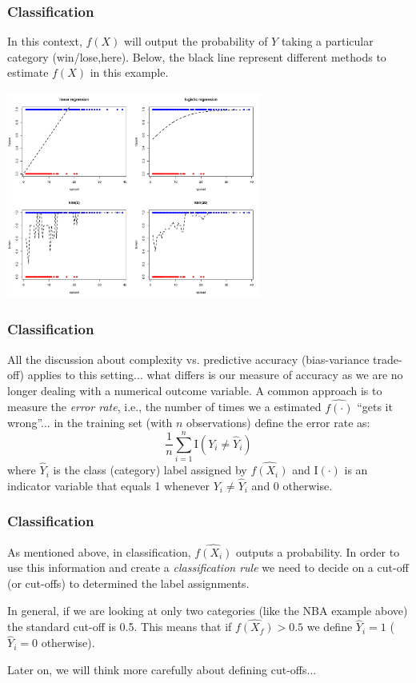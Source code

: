 \documentclass[flegn]{beamer}
\newcommand{\skoo}{\vspace{.2in}}
\begin{document}
\begin{frame}
\frametitle{Classification}
In this context, $f(X)$ will output the {\color{blue}probability} of $Y$ taking a particular category (win/lose,here). Below, the black line represent different methods to estimate $f(X)$ in this example.

\vspace{-0.3cm}
\begin{center}
\includegraphics[width=3.3in]{NBAModels}
\end{center}
\end{frame}

\begin{frame}
\frametitle{Classification}
All the discussion about complexity vs. predictive accuracy (bias-variance trade-off) applies to this setting... what differs is our measure of accuracy as we are no longer dealing with a numerical outcome variable. A common approach is to measure the {\color{red} \it error rate}, i.e., the number of times we a estimated $\widehat{f(\cdot)}$ ``gets it wrong''... in the training set (with $n$ observations) define the error rate as:
$$
\frac{1}{n} \sum_{i=1}^n \mbox{I}(Y_i \neq \hat{Y}_i)
$$
where $\hat{Y}_i$ is the class (category)  label assigned by $\widehat{f(X_i)}$ and $\mbox{I}(\cdot)$ is an indicator variable that equals 1 whenever $Y_i \neq \hat{Y}_i$ and 0 otherwise. 
\end{frame}


\begin{frame}
\frametitle{Classification}

As mentioned above, in classification, $\widehat{f(X_i)}$ outputs a probability. In order to use this information and create a {\color{red}\it classification rule} we need to decide on a {\color{blue}cut-off} (or cut-offs) to determined the label assignments. 

\skoo

In general, if we are looking at only two categories (like the NBA example above) the standard cut-off is 0.5. This means that if  $\widehat{f(X_f)}>0.5$ we define $\hat{Y}_i=1$ ($\hat{Y}_i=0$ otherwise).

\skoo

Later on, we will think more carefully about defining cut-offs... 

\end{frame}
\end{document}
